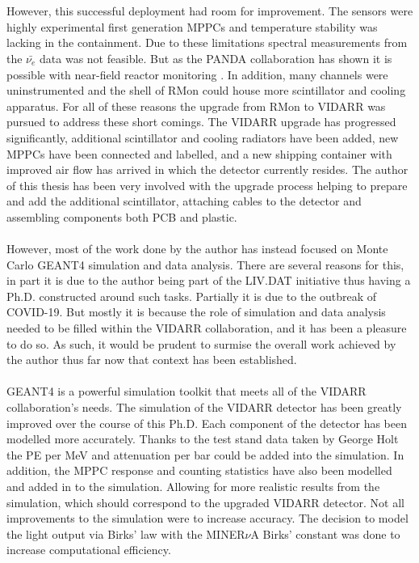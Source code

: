\\\\However, this successful deployment had room for improvement. The sensors were highly experimental first generation MPPCs and temperature stability was lacking in the containment. Due to these limitations spectral measurements from the $\bar{\nu_e}$ data was not feasible. But as the PANDA collaboration has shown it is possible with near-field reactor monitoring \cite{IIRIE_Panda_2021}. In addition, many channels were uninstrumented and the shell of RMon could house more scintillator and cooling apparatus. For all of these reasons the upgrade from RMon to VIDARR was pursued to address these short comings. The VIDARR upgrade has progressed significantly, additional scintillator and cooling radiators have been added, new MPPCs have been connected and labelled, and a new shipping container with improved air flow has arrived in which the detector currently resides. The author of this thesis has been very involved with the upgrade process helping to prepare and add the additional scintillator, attaching cables to the detector and assembling components both PCB and plastic. 
\\\\However, most of the work done by the author has instead focused on Monte Carlo GEANT4 simulation and data analysis. There are several reasons for this, in part it is due to the author being part of the LIV.DAT initiative thus having a Ph.D. constructed around such tasks. Partially it is due to the outbreak of COVID-19. But mostly it is because the role of simulation and data analysis needed to be filled within the VIDARR collaboration, and it has been a pleasure to do so. As such, it would be prudent to surmise the overall work achieved by the author thus far now that context has been established. 
\\\\GEANT4 \cite{Agostinelli:2002hh} is a powerful simulation toolkit that meets all of the VIDARR collaboration's needs. The simulation of the VIDARR detector has been greatly improved over the course of this Ph.D. Each component of the detector has been modelled more accurately. Thanks to the test stand data taken by George Holt the PE per MeV and attenuation per bar could be added into the simulation. In addition, the MPPC response and counting statistics have also been modelled and added in to the simulation. Allowing for more realistic results from the simulation, which should correspond to the upgraded VIDARR detector. Not all improvements to the simulation were to increase accuracy. The decision to model the light output via Birks' law with the MINER$\nu$A Birks' constant was done to increase computational efficiency. 
